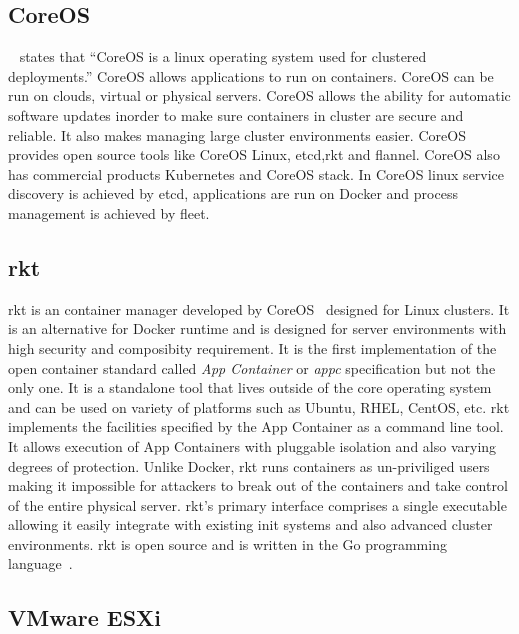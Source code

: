 {\subsection{CoreOS \cv}
~\cite{www-core} states that ``CoreOS is a linux operating system used
for clustered deployments.'' CoreOS allows applications to run on
containers. CoreOS can be run on clouds, virtual or physical
servers. CoreOS allows the ability for automatic software updates
inorder to make sure containers in cluster are secure and reliable. It
also makes managing large cluster environments easier. CoreOS provides
open source tools like CoreOS Linux, etcd,rkt and flannel. CoreOS also
has commercial products Kubernetes and CoreOS stack. In CoreOS linux
service discovery is achieved by etcd, applications are run on Docker
and process management is achieved by fleet.

\subsection{rkt \cv}

rkt is an container manager developed by CoreOS~\cite{www-CoreOS}
designed for Linux clusters. It is an alternative for Docker runtime
and is designed for server environments with high security and
composibity requirement. It is the first implementation of the open
container standard called \textit{App Container} or \textit{appc}
specification but not the only one.  It is a standalone tool that
lives outside of the core operating system and can be used on variety
of platforms such as Ubuntu, RHEL, CentOS, etc. rkt implements the
facilities specified by the App Container as a command line tool. It
allows execution of App Containers with pluggable isolation and also
varying degrees of protection. Unlike Docker, rkt runs containers as
un-priviliged users making it impossible for attackers to break out of
the containers and take control of the entire physical server. rkt's
primary interface comprises a single executable allowing it easily
integrate with existing init systems and also advanced cluster
environments. rkt is open source and is written in the Go programming
language~\cite{www-github/rkt}.

     
\subsection{VMware ESXi}

}
